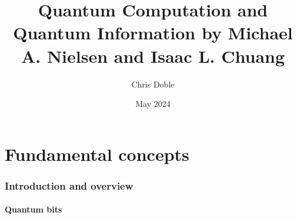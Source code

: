 \documentclass{article}
\title{Quantum Computation and Quantum Information by Michael A. Nielsen and Isaac L. Chuang}
\author{Chris Doble}
\date{May 2024}
\begin{document}
\maketitle

\tableofcontents

\part{Fundamental concepts}

\section{Introduction and overview}

\setcounter{subsection}{1}
\subsection{Quantum bits}
\end{document}
